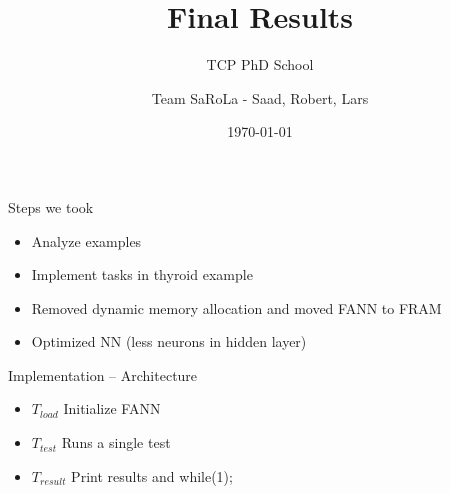 \documentclass{beamer}
\title{Final Results}
\subtitle{TCP PhD School}
\author{Team SaRoLa - Saad, Robert, Lars}
\date{\today}
\begin{document}
\begin{frame}
  \titlepage
\end{frame}

\begin{frame}{Steps we took}
	\begin{itemize}
		\item Analyze examples
		\item Implement tasks in thyroid example
		\item Removed dynamic memory allocation and moved FANN to FRAM
		\item Optimized NN (less neurons in hidden layer)
	\end{itemize}
\end{frame}

\begin{frame}{Implementation -- Architecture}
\centering
{}

\begin{itemize}
	\item \textbf{$T_{load}$} Initialize FANN
	\item \textbf{$T_{test}$} Runs a single test
	\item \textbf{$T_{result}$} Print results and while(1);
\end{itemize}
\end{frame}
\end{document}
